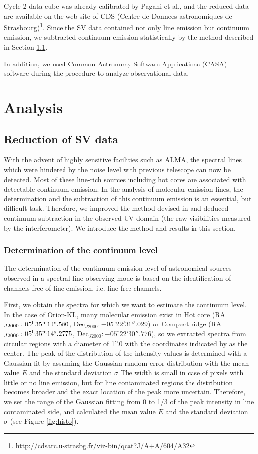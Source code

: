 Cycle 2 data cube was already calibrated by Pagani et al., and the reduced data are available on 
the web site of CDS (Centre de Donnees astronomiques de Strasbourg)\footnote{http://cdsarc.u-strasbg.fr/viz-bin/qcat?J/A+A/604/A32}.
Since the SV data contained not only line emission but continuum emission, 
we subtracted continuum emission statistically by the method described in Section \ref{sec:Statcont}.

In addition, we used Common Astronomy Software Applications (CASA) software \citep{McMullin+2007} 
during the procedure to analyze observational data.

\newpage
\section{Analysis}
\subsection{Reduction of SV data}
\label{sec:Statcont}

With the advent of highly sensitive facilities such as ALMA, the spectral lines which were hindered 
by the noise level with previous telescope can now be detected.
Most of these line-rich sources including hot cores are associated with detectable continuum emission.
In the analysis of molecular emission lines, the determination and the subtraction of this continuum 
emission is an essential, but difficult task. 
Therefore, we improved the method devised in \citet{Sanchez-Monge+2017} and deduced continuum subtraction 
in the observed UV domain (the raw visibilities measured by the interferometer).
We introduce the method and results in this section.

\subsubsection*{Determination of the continuum level}
The determination of the continuum emission level of astronomical sources observed in a spectral line 
observing mode is based on the identification of channels free of line emission, i.e. line-free channels.

First, we obtain the spectra for which we want to estimate the continuum level.  
In the case of Orion-KL, many molecular emission exist in Hot core
(RA$_{J2000}: 05^{\rm{h}}35^{\rm{m}}14^{\rm{s}}.580$, Dec$_{J2000}:-05^{\circ}22'31''.029$) or 
Compact ridge (RA$_{J2000}: 05^{\rm{h}}35^{\rm{m}}14^{\rm{s}}.2775$, Dec$_{J2000}:-05^{\circ}22'30''.776$), 
so we extracted spectra from circular regions with a diameter of 1''.0  with the coordinates indicated by 
\citet{Hirota+2015} as the center.
The peak of the distribution of the intensity values is determined with a Gaussian fit 
by assuming the Gaussian random error distribution with the mean value $E$ and the standard deviation $\sigma$
The width is small in case of pixels with little or no line emission, but for line contaminated 
regions the distribution becomes broader and the exact location of the peak more uncertain. 
Therefore, we set the range of the Gaussian fitting from 0 to 1/3 of the peak intensity in line contaminated side,
and calculated the mean value $E$ and the standard deviation $\sigma$ (see Figure \ref{fig:histo}). 

